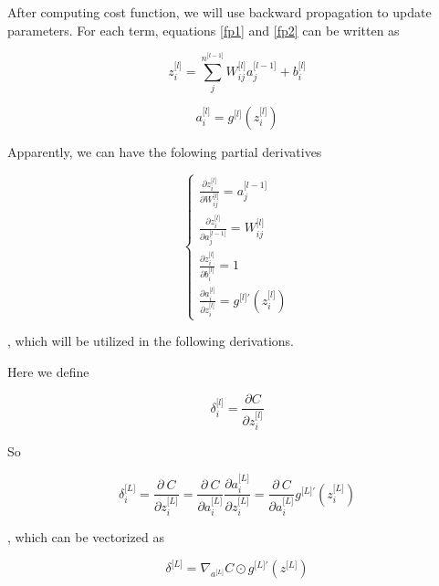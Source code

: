 \documentclass[11pt]{scrartcl} %
\begin{document}
After computing cost function, we will use backward propagation to update parameters. For each term, equations \eqref{fp1} and \eqref{fp2} can be written as

\begin{equation}
z_i^{\lbrack l\rbrack}=\sum_j^{n^{\lbrack l-1\rbrack}}W_{ij}^{\lbrack l\rbrack}a_j^{\lbrack l-1\rbrack}+b_i^{\lbrack l\rbrack}
\end{equation}

\begin{equation}
a_i^{\lbrack l\rbrack}=g^{\lbrack l\rbrack}(z_i^{\lbrack l\rbrack})
\end{equation}

Apparently, we can have the folowing partial derivatives

\begin{equation}
\left\{\begin{array}
{l}\frac{\partial z_i^{\lbrack l\rbrack}}{\partial W_{ij}^{\lbrack l\rbrack}}=a_j^{\lbrack l-1\rbrack}
\\\frac{\partial z_i^{\lbrack l\rbrack}}{\partial a_j^{\lbrack l-1\rbrack}}=W_{ij}^{\lbrack l\rbrack}
\\\frac{\partial z_i^{\lbrack l\rbrack}}{\partial b_i^{\lbrack l\rbrack}}=1
\\\frac{\partial a_i^{\lbrack l\rbrack}}{\partial z_i^{\lbrack l\rbrack}}=g^{{\lbrack l\rbrack}'}(z_i^{\lbrack l\rbrack})
\end{array}\right.
\end{equation}

, which will be utilized in the following derivations.

Here we define

\begin{equation}
\delta_i^{\lbrack l\rbrack}=\frac{\partial C}{\partial z_i^{\lbrack l\rbrack}}
\end{equation}

So 

\begin{equation}
\delta_i^{\lbrack L\rbrack}=\frac{\partial\ C}{\partial z_i^{\lbrack L\rbrack}}=\frac{\partial\ C}{\partial a_i^{\lbrack L\rbrack}}\frac{\partial a_i^{\lbrack L\rbrack}}{\partial z_i^{\lbrack L\rbrack}}=\frac{\partial\ C}{\partial a_i^{\lbrack L\rbrack}}g^{{\lbrack L\rbrack}'}(z_i^{\lbrack L\rbrack})
\end{equation}

, which can be vectorized as 

\begin{equation}
\delta^{\lbrack L\rbrack}=\nabla_{a^{\lbrack L\rbrack}}C\odot g^{{\lbrack L\rbrack}'}(z^{\lbrack L\rbrack})
\label{bp1}
\end{equation}
\end{document}
